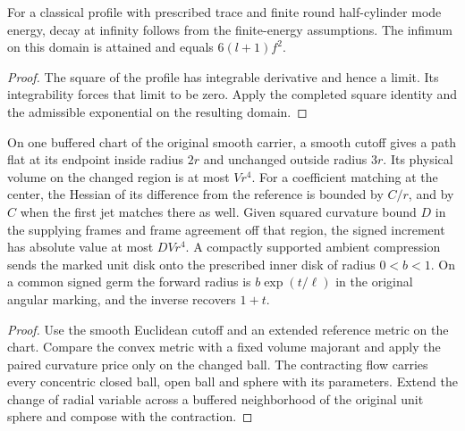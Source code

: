 \begin{proposition}
\label{prop:ed45-round-decay}
\leanok
For a classical profile with prescribed trace and finite round half-cylinder
mode energy, decay at infinity follows from the finite-energy assumptions.
The infimum on this domain is attained and equals $6(l+1)f^2$.
\end{proposition}
\begin{proof}
\leanok
The square of the profile has integrable derivative and hence a limit.
Its integrability forces that limit to be zero. Apply the completed square
identity and the admissible exponential on the resulting domain.
\end{proof}

\begin{proposition}
\label{prop:ed45-pocket}
\leanok
On one buffered chart of the original smooth carrier, a smooth cutoff
gives a path flat at its endpoint inside radius $2r$ and unchanged
outside radius $3r$. Its physical volume on the changed region is
at most $Vr^4$. For a coefficient matching at the center, the Hessian
of its difference from the reference is bounded by $C/r$, and by $C$
when the first jet matches there as well. Given squared curvature bound $D$ in the supplying
frames and frame agreement off that region, the signed increment has
absolute value at most $DVr^4$. A compactly supported ambient compression
sends the marked unit disk onto the prescribed inner disk of radius
$0<b<1$. On a common signed germ the forward radius is $b\exp(t/\ell)$
in the original angular marking, and the inverse recovers $1+t$.
\end{proposition}
\begin{proof}
\leanok
Use the smooth Euclidean cutoff and an extended reference metric on the
chart. Compare the convex metric with a fixed volume majorant and apply
the paired curvature price only on the changed ball. The contracting
flow carries every concentric closed ball, open ball and sphere with
its parameters. Extend the change of radial variable across a buffered
neighborhood of the original unit sphere and compose with the contraction.
\end{proof}

